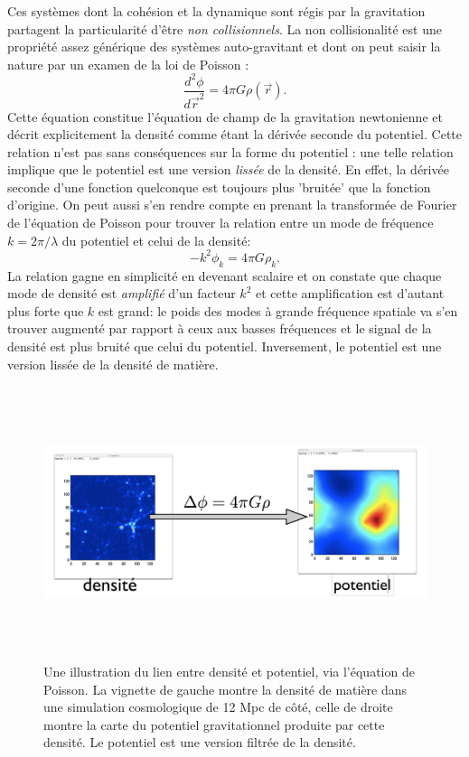 Ces systèmes dont la cohésion et la dynamique sont régis par la gravitation partagent la particularité d'être \textit{non collisionnels}. La non collisionalité est une propriété assez générique des systèmes auto-gravitant  et dont on peut saisir la nature par un examen de la loi de Poisson  :
\begin{equation}
\frac{d^2\phi}{d\vec{r}^2}=4\pi G\rho(\vec{r}).
\end{equation} 
Cette équation constitue l'équation de champ de la gravitation newtonienne et décrit explicitement la densité comme étant la dérivée seconde du potentiel. Cette relation n'est pas sans conséquences sur la forme du potentiel : une telle relation implique que le potentiel est une version \textit{lissée} de la densité. En effet, la dérivée seconde d'une fonction quelconque est toujours plus 'bruitée' que la fonction d'origine. On peut aussi s'en rendre compte en prenant la transformée de Fourier de l'équation de Poisson pour trouver la relation entre un mode de fréquence $k=2\pi/\lambda$ du potentiel et celui de la densité:
\begin{equation}
-k^2 \phi_k=4\pi G \rho_k.
\end{equation}
La relation gagne en simplicité en devenant scalaire et on constate que chaque mode de densité est \textit{amplifié} d'un facteur $k^2$ et cette amplification est d'autant plus forte que $k$ est grand: le poids des modes à grande fréquence spatiale va s'en trouver augmenté par rapport à ceux aux basses fréquences et le signal de la densité est plus bruité que celui du potentiel. Inversement, le potentiel est une version lissée de la densité de matière.
\begin{figure}[htbp]
	\centering
		\includegraphics[height=8cm]{figs/poisson.png}
	\caption{Une illustration du lien entre densité et potentiel, via l'équation de Poisson. La vignette de gauche montre la densité de matière dans une simulation cosmologique de 12 Mpc de côté, celle de droite montre la carte du potentiel gravitationnel produite par cette densité. Le potentiel est une version filtrée de la densité.} 
	\label{f:poisson}
\end{figure}

